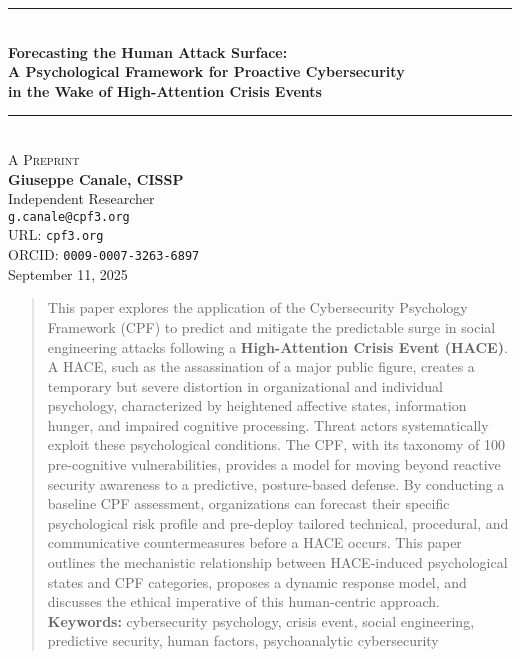 \documentclass[11pt,a4paper]{article}
\begin{document}
\thispagestyle{empty}
\begin{center}
\rule{\textwidth}{1pt} \\[1.2cm] %
{\LARGE \textbf{\textcolor{titlecolor}{Forecasting the Human Attack Surface:}}} \\[0.4cm]
{\LARGE \textbf{\textcolor{titlecolor}{A Psychological Framework for Proactive Cybersecurity}}} \\[0.4cm]
{\LARGE \textbf{\textcolor{titlecolor}{in the Wake of High-Attention Crisis Events}}} \\[1.2cm]
\rule{\textwidth}{1pt} \\[0.8cm]
{\large \textsc{A Preprint}} \\[1cm]
{\Large \textbf{Giuseppe Canale, CISSP}} \\[0.4cm]
Independent Researcher \\[0.3cm]
\texttt{g.canale@cpf3.org} \\[0.3cm]
URL: \texttt{cpf3.org} \\[0.3cm]
ORCID: \texttt{0009-0007-3263-6897} \\[1.2cm]
{\large September 11, 2025}
\end{center}

\begin{abstract}
\noindent
This paper explores the application of the Cybersecurity Psychology Framework (CPF) to predict and mitigate the predictable surge in social engineering attacks following a \textbf{High-Attention Crisis Event (HACE)}. A HACE, such as the assassination of a major public figure, creates a temporary but severe distortion in organizational and individual psychology, characterized by heightened affective states, information hunger, and impaired cognitive processing. Threat actors systematically exploit these psychological conditions. The CPF, with its taxonomy of 100 pre-cognitive vulnerabilities, provides a model for moving beyond reactive security awareness to a predictive, posture-based defense. By conducting a baseline CPF assessment, organizations can forecast their specific psychological risk profile and pre-deploy tailored technical, procedural, and communicative countermeasures before a HACE occurs. This paper outlines the mechanistic relationship between HACE-induced psychological states and CPF categories, proposes a dynamic response model, and discusses the ethical imperative of this human-centric approach.
\vspace{0.5em}
\noindent\textbf{Keywords:} cybersecurity psychology, crisis event, social engineering, predictive security, human factors, psychoanalytic cybersecurity
\end{abstract}
\end{document}
